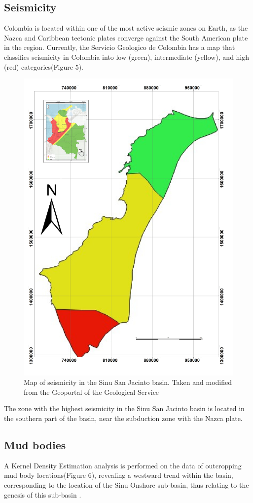 \documentclass{ifacconf}
\begin{document}
\subsection{Seismicity}
Colombia is located within one of the most active seismic zones on Earth, as the Nazca and Caribbean tectonic plates converge against the South American plate in the region. Currently, the Servicio Geologico de Colombia has a map that classifies seismicity in Colombia into low (green), intermediate (yellow), and high (red) categories(Figure 5).

\begin{figure}[h]
	\centering
	\includegraphics[width=0.5\linewidth]{img/Mapadesismicidad}
	\caption[Seismicity]{Map of seismicity in the Sinu San Jacinto basin. Taken and modified from the Geoportal of the Geological Service}
	\label{fig:mapadesismicidad}
\end{figure}
The zone with the highest seismicity in the Sinu San Jacinto basin is located in the southern part of the basin, near the subduction zone with the Nazca plate.

\subsection{Mud bodies}
A Kernel Density Estimation analysis is performed on the data of outcropping mud body locations(Figure 6), revealing a westward trend within the basin, corresponding to the location of the Sinu Onshore sub-basin, thus relating to the genesis of this sub-basin \cite{Rossello2022}.
\end{document}
